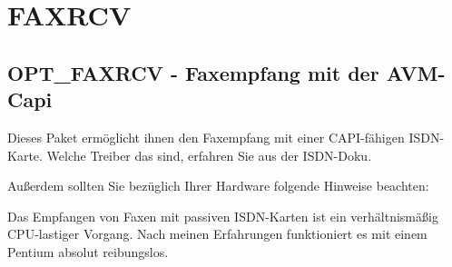 {
\section{FAXRCV}
}

\subsection {OPT\_FAXRCV - Faxempfang mit der AVM-Capi }

  Dieses Paket ermöglicht ihnen den Faxempfang mit einer CAPI-fähigen
  ISDN-Karte. Welche Treiber das sind, erfahren Sie aus der ISDN-Doku.

  Außerdem sollten Sie bezüglich Ihrer Hardware folgende Hinweise beachten:

  Das Empfangen von Faxen mit passiven ISDN-Karten ist ein verhältnismäßig
  CPU-lastiger Vorgang.
  Nach meinen Erfahrungen funktioniert es mit einem Pentium absolut reibungslos.

